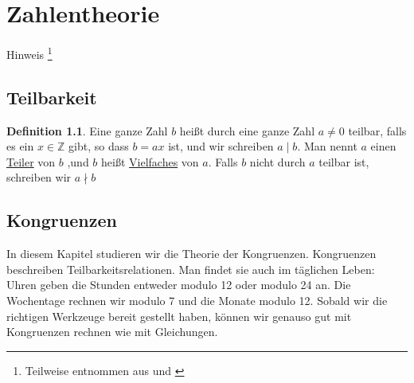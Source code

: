 \documentclass[a4paper,10pt,DIV9, BCOR12mm, oneside,openright,openbib]{scrreprt}
\theoremstyle{definition}
\newtheorem{mydef}{Definition}[section]
\theoremstyle{plain}
\begin{document}



\chapter{Zahlentheorie}
Hinweis \footnote{Teilweise entnommen aus \cite{Bouw2010} und \cite{Maier2009/10}}
\section{Teilbarkeit}
\begin{mydef} \label{Teilbark} 
Eine ganze Zahl $b$ heißt durch eine ganze Zahl $a \neq 0$ teilbar, falls es ein $x \in \mathbb{Z}$ gibt, so dass $b = ax$ ist, und wir schreiben $ a \mid b$. Man nennt $a$ einen \underline{Teiler} von $b$ ,und $b$ heißt \underline{Vielfaches} von $a$. Falls $b$ nicht durch $a$ teilbar ist, schreiben wir $a \nmid b$
\end{mydef}

\section{Kongruenzen} In diesem Kapitel studieren wir die Theorie der Kongruenzen. Kongruenzen beschreiben Teilbarkeitsrelationen. Man findet sie auch im täglichen Leben: Uhren geben die Stunden entweder modulo 12 oder modulo 24 an. Die Wochentage rechnen wir modulo 7 und die Monate modulo 12. Sobald wir die richtigen Werkzeuge bereit gestellt haben, können wir genauso gut mit Kongruenzen rechnen wie mit Gleichungen.
\end{document}
